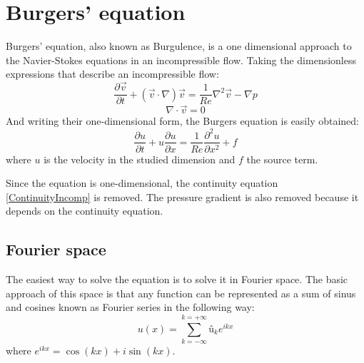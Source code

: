 \chapter{Burgers' equation}
Burgers' equation, also known as Burgulence, is a one dimensional approach to the Navier-Stokes equations in an incompressible flow. Taking the dimensionless expressions that describe an incompressible flow:
\begin{equation}
\frac{\partial\vec{v}}{\partial t}+\left(\vec{v}\cdot\nabla\right)\vec{v}=\frac{1}{Re}\nabla^{2}\vec{v}-\nabla p
\end{equation}
\begin{equation}
\nabla\cdot\vec{v}=0
\label{ContinuityIncomp}
\end{equation}
And writing their one-dimensional form, the Burgers equation is easily obtained:
\begin{equation}
\frac{\partial u}{\partial t}+u\frac{\partial u}{\partial x}=\frac{1}{Re}\frac{\partial^{2}u}{\partial x^{2}}+f
\end{equation}
where $u$ is the velocity in the studied dimension and $f$ the source term.

Since the equation is one-dimensional, the continuity equation \ref{ContinuityIncomp} is removed. The pressure gradient is also removed because it depends on the continuity equation.

\section{Fourier space}
The easiest way to solve the equation is to solve it in Fourier space. The basic approach of this space is that any function can be represented as a sum of sinus and cosines known as Fourier series in the following way:
\begin{equation}
u\left(x\right)=\sum_{k=-\infty}^{k=+\infty}û_{k}e^{ikx}
\end{equation}
where $e^{ikx}=\cos\left(kx\right)+i\sin\left(kx\right)$.

